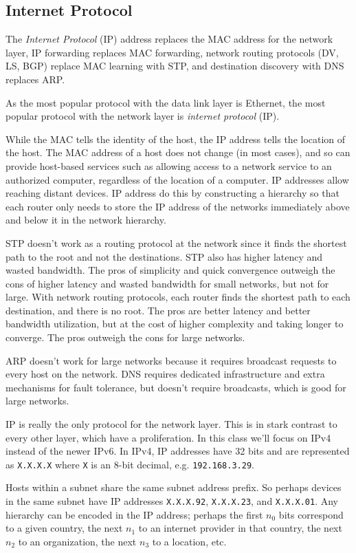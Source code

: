 \subsection{Internet Protocol}

The \emph{Internet Protocol} (IP) address replaces the MAC
address for the network layer, IP forwarding replaces MAC
forwarding, network routing protocols
(DV, LS, BGP) replace MAC learning
with STP, and destination discovery
with DNS replaces ARP.

As the most popular protocol with the
data link layer is Ethernet, the most
popular protocol with the network
layer is \emph{internet protocol}
(IP).

While the MAC tells the identity
of the host, the IP address tells
the location of the host. The MAC
address of a host does not change
(in most cases), and so can provide
host-based services such as allowing
access to a network service to an
authorized computer, regardless of
the location of a computer. IP
addresses allow reaching distant
devices. IP address do this by
constructing a hierarchy so that
each router only needs to store
the IP address of the networks
immediately above and below it
in the network hierarchy.

STP doesn't work as a routing
protocol at the network since
it finds the shortest path to
the root and not the destinations.
STP also has higher latency and
wasted bandwidth. The pros of
simplicity and quick convergence
outweigh the cons of higher
latency and wasted bandwidth
for small networks, but not for
large. With network routing
protocols, each router finds
the shortest path to each
destination, and there is no
root. The pros are better
latency and better bandwidth
utilization, but at the cost
of higher complexity and
taking longer to converge. The
pros outweigh the cons for
large networks.

ARP doesn't work for large networks
because it requires broadcast
requests to every host on the
network. DNS requires dedicated
infrastructure and extra mechanisms
for fault tolerance, but doesn't
require broadcasts, which is
good for large networks.

IP is really the only protocol for the network layer.
This is in stark contrast to every other layer, which
have a proliferation. In this class we'll focus on IPv4
instead of the newer IPv6. In IPv4,
IP addresses have 32 bits and are
represented as \texttt{X.X.X.X} where
\texttt{X} is an 8-bit decimal, e.g.
\texttt{192.168.3.29}.

Hosts within a subnet share the same
subnet address prefix. So perhaps
devices in the same subnet have IP
addresses \texttt{X.X.X.92},
\texttt{X.X.X.23}, and \texttt{X.X.X.01}.
Any hierarchy can be encoded in the IP
address; perhaps the first $n_0$ bits
correspond to a given country, the next
$n_1$ to an internet provider in that
country, the next $n_2$ to an organization,
the next $n_3$ to a location, etc.

